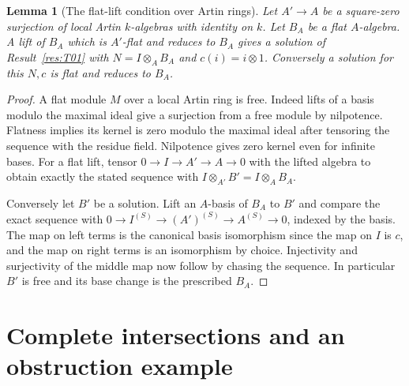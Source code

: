 \documentclass[11pt,oneside,openany]{book}
\newtheorem{lemma}[theorem]{Lemma}
\theoremstyle{definition}
\theoremstyle{remark}
\begin{document}
\begin{lemma}[The flat-lift condition over Artin rings]\label{res:T03}
Let \(A'\to A\) be a square-zero surjection of local Artin
\(k\)-algebras with identity on \(k\). Let \(B_A\) be a flat
\(A\)-algebra. A lift of \(B_A\) which is \(A'\)-flat and reduces
to \(B_A\) gives a solution of Result~\ref{res:T01} with
\(N=I\otimes_A B_A\) and \(c(i)=i\otimes1\). Conversely a
solution for this \(N,c\) is flat and reduces to \(B_A\).
\end{lemma}
\begin{proof}
A flat module \(M\) over a local Artin ring is free. Indeed lifts
of a basis modulo the maximal ideal give a surjection from a free
module by nilpotence. Flatness implies its kernel is zero modulo
the maximal ideal after tensoring the sequence with the residue
field. Nilpotence gives zero kernel even for infinite bases.
For a flat lift, tensor \(0\to I\to A'\to A\to0\) with the lifted
algebra to obtain exactly the stated sequence with
\(I\otimes_{A'} B'=I\otimes_A B_A\).

Conversely let \(B'\) be a solution. Lift an \(A\)-basis of \(B_A\)
to \(B'\) and compare the exact sequence with
\(0\to I^{(S)}\to (A')^{(S)}\to A^{(S)}\to0\), indexed by the basis.
The map on left terms is the canonical basis isomorphism since
the map on \(I\) is \(c\), and the map on right terms is an
isomorphism by choice. Injectivity and surjectivity of the middle
map now follow by chasing the sequence. In particular \(B'\)
is free and its base change is the prescribed \(B_A\).
\end{proof}

\section{Complete intersections and an obstruction example}
\end{document}

